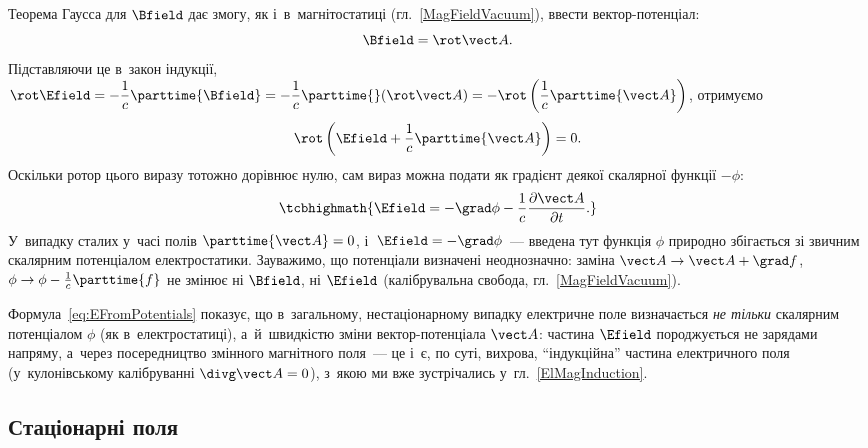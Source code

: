 Теорема Гаусса для $\Bfield$ дає змогу, як і~в~магнітостатиці (гл.~\ref{MagFieldVacuum}),
ввести вектор-потенціал:
\begin{equation*}
	\Bfield = \rot\vect A.
\end{equation*}
Підставляючи це в~закон індукції, $\rot\Efield = -\dfrac1c\parttime{\Bfield} =
-\dfrac1c\parttime{}(\rot\vect A) = -\rot\left(\dfrac1c \parttime{\vect A}\right)$,
отримуємо
\begin{equation*}
	\rot\left(\Efield+\frac1c\parttime{\vect A}\right) = 0.
\end{equation*}
Оскільки ротор цього виразу тотожно дорівнює нулю, сам вираз можна подати як градієнт
деякої скалярної функції $-\phi$:
\begin{equation}\label{eq:EFromPotentials}
	\tcbhighmath{
		\Efield = -\grad\phi - \frac1c\frac{\partial\vect A}{\partial t}.
	}
\end{equation}
У~випадку сталих у~часі полів $\parttime{\vect A}=0$, і~$\Efield=-\grad\phi$~--- введена
тут функція $\phi$ природно збігається зі звичним скалярним потенціалом електростатики.
Зауважимо, що потенціали визначені неоднозначно: заміна $\vect A\to\vect A+\grad f$,
$\phi\to\phi-\frac1c\parttime{f}$ не змінює ні $\Bfield$, ні $\Efield$ (калібрувальна
свобода, гл.~\ref{MagFieldVacuum}).

\begin{Attention}
	Формула~\eqref{eq:EFromPotentials} показує, що в~загальному, нестаціонарному випадку
	електричне поле визначається \emph{не тільки} скалярним потенціалом $\phi$ (як
	в~електростатиці), а~й~швидкістю зміни вектор-потенціала $\vect A$: частина $\Efield$
	породжується не зарядами напряму, а~через посередництво змінного магнітного поля~---
	це і~є, по суті, вихрова, \enquote{індукційна} частина електричного поля
	(у~кулонівському калібруванні $\divg\vect A = 0$), з~якою ми вже зустрічались
	у~гл.~\ref{ElMagInduction}.
\end{Attention}


\subsection*{Стаціонарні поля}


